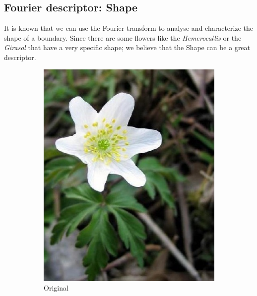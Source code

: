 \documentclass[11]{article}
\begin{document}
\subsection{Fourier descriptor: Shape}
It is known that we can use the Fourier transform to analyse and characterize the shape of a boundary. Since there are some flowers like the \textit{Hemerocallis} or the \textit{Girasol} that have a very specific shape; we believe that the Shape can be a great descriptor. 

\begin{figure}[H]
    \begin{subfigure}[t]{0.45\textwidth}
    \centering
  \includegraphics[scale=0.25]{images/originalfourier.jpg}
    \caption{Original}
    \label{originalfourier}
    \end{subfigure}
    \begin{subfigure}[t]{0.45\textwidth}
    \centering

\end{subfigure}
\end{figure}
\end{document}
